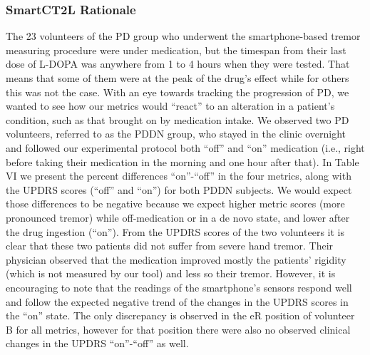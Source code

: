 \subsubsection{SmartCT2L Rationale}
\label{subsubsec:smartCT2LRationale}
The 23 volunteers of the PD group who underwent the smartphone-based tremor measuring procedure were under medication, but the timespan from their last dose of L-DOPA was anywhere from 1 to 4 hours when they were tested. That means that some of them were at the peak of the drug’s effect while for others this was not the case. With an eye towards tracking the progression of PD, we wanted to see how our metrics would “react” to an alteration in a patient’s condition, such as that brought on by medication intake. We observed two PD volunteers, referred to as the PDDN group, who stayed in the clinic overnight and followed our experimental protocol both “off” and “on” medication (i.e., right before taking their medication in the morning and one hour after that). In Table VI we present the percent differences “on”-“off” in the four metrics, along with the UPDRS scores (“off” and “on”) for both PDDN subjects. We would expect those differences to be negative because we expect higher metric scores (more pronounced tremor) while off-medication or in a de novo state, and lower after the drug ingestion (“on”). 
From the UPDRS scores of the two volunteers it is clear that these two patients did not suffer from severe hand tremor. Their physician observed that the medication improved mostly the patients’ rigidity (which is not measured by our tool) and less so their tremor. However, it is encouraging to note that the readings of the smartphone’s sensors respond well and follow the expected negative trend of the changes in the UPDRS scores in the “on” state. The only discrepancy is observed in the eR position of volunteer B for all metrics, however for that position there were also no observed clinical changes in the UPDRS “on”-“off” as well. 

